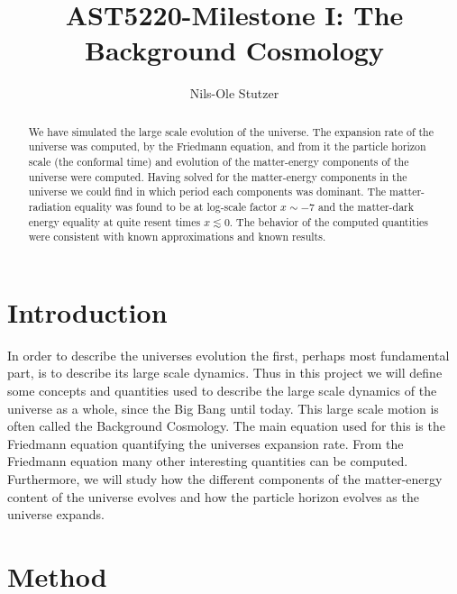 \documentclass[twocolumn]{aastex62}
\begin{document}
\title{\Large AST5220-Milestone I: The Background Cosmology}

\author{Nils-Ole Stutzer}

\begin{abstract}
    We have simulated the large scale evolution of the universe. The expansion
    rate of the universe was computed, by the Friedmann equation, and from it the particle
    horizon scale (the conformal time) and evolution of the matter-energy components of the universe were computed. 
    Having solved for the matter-energy components in the universe we could find in which period each components was dominant. 
    The matter-radiation equality was found to be at log-scale factor
    $x\sim -7$ and the matter-dark energy equality at quite resent times $x\lesssim 0$. The behavior of
    the computed quantities were consistent with known approximations and known results.
\end{abstract}

\section{Introduction} \label{sec:Intro}
In order to describe the universes evolution the first, perhaps most fundamental
part, is to describe its large scale dynamics. Thus in this project we will define 
some concepts and quantities used to describe the
large scale dynamics of the universe as a whole, since the Big Bang until
today. This large scale motion is often called the Background Cosmology. 
The main equation used for this is
the Friedmann equation quantifying the universes expansion rate. From the Friedmann
equation many other interesting quantities can be computed. Furthermore, we will study how the different components
of the matter-energy content of the universe evolves and how the particle horizon
evolves as the universe expands.

\section{Method} \label{sec:Method}
\end{document}

